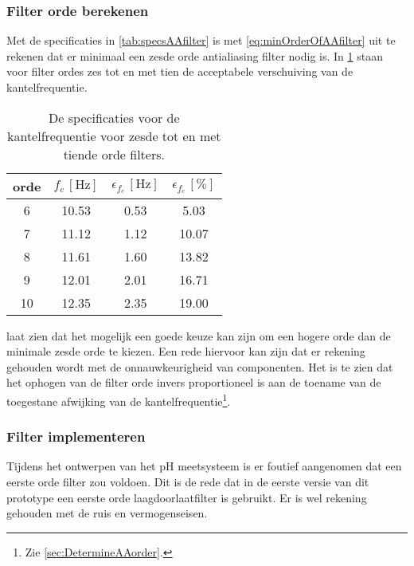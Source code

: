 \subsubsection{Filter orde berekenen}
Met de specificaties in \cref{tab:specsAAfilter} is met \cref{eq:minOrderOfAAfilter} uit te rekenen dat er minimaal een zesde orde antialiasing filter nodig is. In \cref{tab:AA3dBspecs} staan voor filter ordes zes tot en met tien de acceptabele verschuiving van de kantelfrequentie.
\begin{table}[!htbp]
    \centering
    \begin{tabular}{c|c|c|c}
        orde & $f_c\,[\si{\hertz}]$ & $\epsilon_{f_c}\,[\si{\hertz}]$ & $\epsilon_{f_c}\,[\%]$ \\\hline
        6    & 10.53 & 0.53 & 5.03  \\
        7    & 11.12 & 1.12 & 10.07 \\
        8    & 11.61 & 1.60 & 13.82 \\
        9    & 12.01 & 2.01 & 16.71 \\
        10   & 12.35 & 2.35 & 19.00 \\
    \end{tabular}
    \caption{De specificaties voor de kantelfrequentie voor zesde tot en met tiende orde filters.}
    \label{tab:AA3dBspecs}
\end{table}
 laat zien dat het mogelijk een goede keuze kan zijn om een hogere orde dan de minimale zesde orde te kiezen. Een rede hiervoor kan zijn dat er rekening gehouden wordt met de onnauwkeurigheid van componenten. Het is te zien dat het ophogen van de filter orde invers proportioneel is aan de toename van de toegestane afwijking van de kantelfrequentie\footnote{Zie \cref{sec:DetermineAAorder}.}.

\subsubsection{Filter implementeren} \label{sec:filterFout}
Tijdens het ontwerpen van het pH meetsysteem is er foutief aangenomen dat een eerste orde filter zou voldoen. Dit is de rede dat in de eerste versie van dit prototype een eerste orde laagdoorlaatfilter is gebruikt. Er is wel rekening gehouden met de ruis en vermogenseisen.

